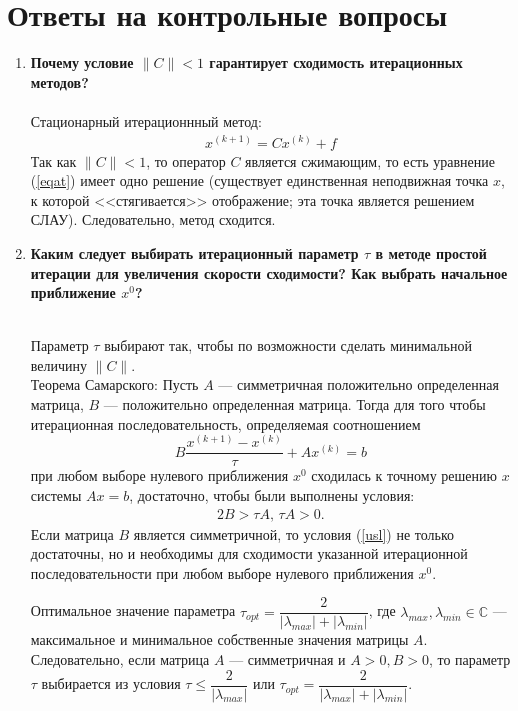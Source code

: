 \documentclass[12pt,a4paper]{article}
\begin{document}
\section{Ответы на контрольные вопросы}
\begin{enumerate}
\item \textbf{Почему условие $\|C\|<1$ гарантирует сходимость итерационных методов?}\\
\\
Стационарный итерационнный метод:
\begin{gather}
x^{(k+1)}=C x^{(k)}+f
\label{eqat}
\end{gather}
Так как $\|C\|<1$, то оператор $C$ является сжимающим, то есть уравнение (\ref{eqat}) имеет одно решение (существует единственная неподвижная точка $x$, к которой <<стягивается>> отображение; эта точка является решением СЛАУ). Следовательно, метод сходится.
\\
\item \textbf{Каким следует выбирать итерационный параметр $\tau$ в методе простой итерации для увеличения скорости сходимости? Как выбрать начальное приближение $x^0$?}\\
\\
\par
Параметр $\tau$ выбирают так, чтобы по возможности сделать минимальной величину $\|C\|$. \\
Теорема Самарского: Пусть $A$ --- симметричная положительно определенная матрица, $B$ --- положительно определенная матрица. Тогда для того чтобы итерационная последовательность, определяемая соотношением 
$$
B \frac{x^{(k+1)}-x^{(k)}}{\tau}+A x^{(k)}=b
$$
при любом выборе нулевого приближения $x^0$ сходилась к точному решению $x$ системы $A x=b$, достаточно, чтобы были выполнены условия:
\begin{gather}
2 B>\tau A, \, \tau A>0.
\label{usl}
\end{gather}
Если матрица $B$ является симметричной, то условия (\ref{usl}) не только достаточны, но и необходимы для сходимости указанной итерационной последовательности при любом выборе нулевого приближения $x^0$.
\par
Оптимальное значение параметра $\tau_{opt}=\dfrac{2}{|\lambda_{max}|+|\lambda_{min}|}$, где $\lambda_{max}, \lambda_{min} \in \mathbb{C}$ --- максимальное и минимальное собственные значения матрицы $A$.\\
Следовательно, если матрица $A$ --- симметричная и $A>0, B>0$, то параметр $\tau$ выбирается из условия $\tau \le \dfrac{2}{|\lambda_{max}|}$ или $\tau_{opt}=\dfrac{2}{|\lambda_{max}|+|\lambda_{min}|}$.\\

\end{enumerate}
\end{document}

